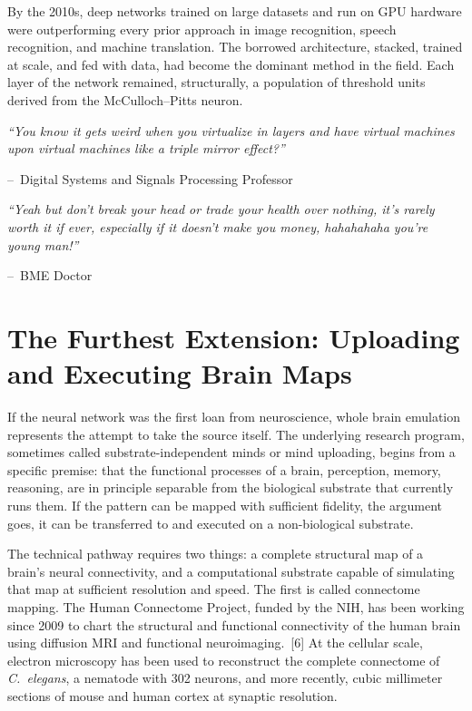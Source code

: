\documentclass[11pt,a4paper]{article}
\renewenvironment{quote}
  {\list{}{\leftmargin=2.2em\rightmargin=2.2em\topsep=0.4em\parsep=0.3em}%
   \item\relax\itshape}
  {\endlist}
\newcommand{\attrib}[1]{\par\vspace{0.2em}\normalfont\small\hspace*{0em}--\ #1\par}
\begin{document}
By the 2010s, deep networks trained on large datasets and run on GPU hardware were outperforming every prior approach in image recognition, speech recognition, and machine translation. The borrowed architecture, stacked, trained at scale, and fed with data, had become the dominant method in the field. Each layer of the network remained, structurally, a population of threshold units derived from the McCulloch--Pitts neuron.

\begin{quote}
``You know it gets weird when you virtualize in layers and have virtual machines upon virtual machines like a triple mirror effect?''
\attrib{Digital Systems and Signals Processing Professor}
\end{quote}

\begin{quote}
``Yeah but don't break your head or trade your health over nothing, it's rarely worth it if ever, especially if it doesn't make you money, hahahahaha you're young man!''
\attrib{BME Doctor}
\end{quote}

\section{The Furthest Extension: Uploading and Executing Brain Maps}

If the neural network was the first loan from neuroscience, whole brain emulation represents the attempt to take the source itself. The underlying research program, sometimes called substrate-independent minds or mind uploading, begins from a specific premise: that the functional processes of a brain, perception, memory, reasoning, are in principle separable from the biological substrate that currently runs them. If the pattern can be mapped with sufficient fidelity, the argument goes, it can be transferred to and executed on a non-biological substrate.

The technical pathway requires two things: a complete structural map of a brain's neural connectivity, and a computational substrate capable of simulating that map at sufficient resolution and speed. The first is called connectome mapping. The Human Connectome Project, funded by the NIH, has been working since 2009 to chart the structural and functional connectivity of the human brain using diffusion MRI and functional neuroimaging.~[6] At the cellular scale, electron microscopy has been used to reconstruct the complete connectome of \textit{C.~elegans}, a nematode with 302 neurons, and more recently, cubic millimeter sections of mouse and human cortex at synaptic resolution.
\end{document}
